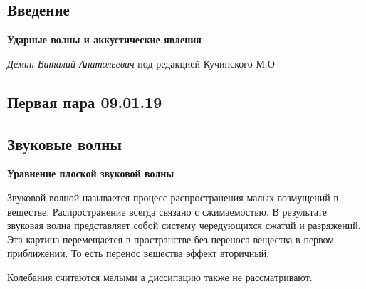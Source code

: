 \documentclass[14pt,a4paper,oneside]{extarticle}	%
\begin{document}
\newpage 	%

\setcounter{page}{2}%
\renewcommand{\contentsname}{\center{Содержание}} 	%
\tableofcontents

\newpage

	\begin{center}
		\section*{Введение} %
	\end{center}

\begin{center}

	\textbf{Ударные волны и аккустические явления}

	\textit{Дёмин Виталий Анатольевич} под редакцией Кучинского М.О

\end{center}

\newpage

\begin{center}
	\section*{Первая пара 09.01.19} %
	\subsection*{Звуковые волны} %
\end{center}



\textbf{Уравнение плоской звуковой волны}

Звуковой волной называется процесс распространения малых возмущений в веществе.
Распространение всегда связано с сжимаемостью. В результате звуковая волна представляет собой систему чередующихся сжатий и разряжений.
Эта картина перемещается в пространстве без переноса вещества в первом приближении.
То есть перенос вещества эффект вторичный.

Колебания считаются малыми а диссипацию также не рассматривают.
\end{document}
